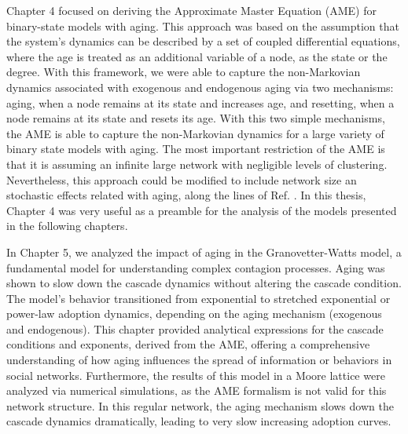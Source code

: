 Chapter 4 focused on deriving the Approximate Master Equation (AME) for binary-state models with aging. This approach was based on the assumption that the system's dynamics can be described by a set of coupled differential equations, where the age is treated as an additional variable of a node, as the state or the degree. With this framework, we were able to capture the non-Markovian dynamics associated with exogenous and endogenous aging via two mechanisms: aging, when a node remains at its state and increases age, and resetting, when a node remains at its state and resets its age. With this two simple mechanisms, the AME is able to capture the non-Markovian dynamics for a large variety of binary state models with aging. The most important restriction of the AME is that it is assuming an infinite large network with negligible levels of clustering. Nevertheless, this approach could be modified to include network size an stochastic effects related with aging, along the lines of Ref. \cite{peralta-2020B}. In this thesis, Chapter 4 was very useful as a preamble for the analysis of the models presented in the following chapters.

In Chapter 5, we analyzed the impact of aging in the Granovetter-Watts model, a fundamental model for understanding complex contagion processes. Aging was shown to slow down the cascade dynamics without altering the cascade condition. The model's behavior transitioned from exponential to stretched exponential or power-law adoption dynamics, depending on the aging mechanism (exogenous and endogenous). This chapter provided analytical expressions for the cascade conditions and exponents, derived from the AME, offering a comprehensive understanding of how aging influences the spread of information or behaviors in social networks. Furthermore, the results of this model in a Moore lattice were analyzed via numerical simulations, as the AME formalism is not valid for this network structure. In this regular network, the aging mechanism slows down the cascade dynamics dramatically, leading to very slow increasing adoption curves.

